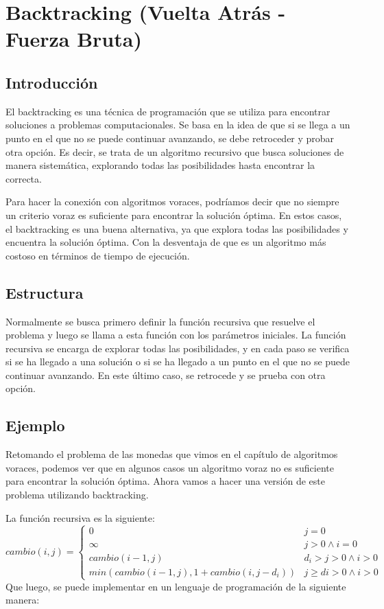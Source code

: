 \chapter{Backtracking (Vuelta Atrás - Fuerza Bruta)}

\section{Introducción}

El backtracking es una técnica de programación que se utiliza para encontrar soluciones a problemas computacionales. Se basa en la idea de que si se llega a un punto en el que no se puede continuar avanzando, se debe retroceder y probar otra opción. Es decir, se trata de un algoritmo recursivo que busca soluciones de manera sistemática, explorando todas las posibilidades hasta encontrar la correcta. 

Para hacer la conexión con algoritmos voraces, podríamos decir que no siempre un criterio voraz es suficiente para encontrar la solución óptima. En estos casos, el backtracking es una buena alternativa, ya que explora todas las posibilidades y encuentra la solución óptima. Con la desventaja de que es un algoritmo más costoso en términos de tiempo de ejecución.

\section{Estructura}
Normalmente se busca primero definir la función recursiva que resuelve el problema y luego se llama a esta función con los parámetros iniciales. La función recursiva se encarga de explorar todas las posibilidades, y en cada paso se verifica si se ha llegado a una solución o si se ha llegado a un punto en el que no se puede continuar avanzando. En este último caso, se retrocede y se prueba con otra opción.

\section{Ejemplo}
Retomando el problema de las monedas que vimos en el capítulo de algoritmos voraces, podemos ver que en algunos casos un algoritmo voraz no es suficiente para encontrar la solución óptima. Ahora vamos a hacer una versión de este problema utilizando backtracking.

La función recursiva es la siguiente:
$$
cambio(i, j) = 
\begin{cases}
    0 & j = 0 \\
    \infty & j > 0 \wedge i = 0 \\
    cambio(i - 1, j) &  d_i > j > 0 \wedge i > 0 \\
    min(cambio(i - 1, j), 1 + cambio(i, j - d_i)) & j \geq di > 0 \wedge i > 0
\end{cases}
$$
Que luego, se puede implementar en un lenguaje de programación de la siguiente manera:

